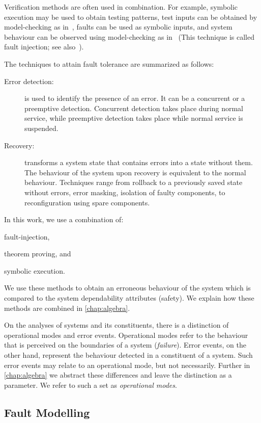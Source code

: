 \documentclass[12pt,openright,twoside,a4paper,oldfontcommands,english,brazil,final]{abntex2}
\theoremstyle{theo}
\begin{document}
Verification methods are often used in combination.
For example, symbolic execution may be used to obtain testing patterns, test inputs can be obtained by model-checking as in~\cite{CBC+2015}, faults can be used as symbolic inputs, and system behaviour can be observed using model-checking as in~\cite{DM2012,Didier2012} (This technique is called fault injection; see also~\cite{AAL+1996}).

The techniques to attain fault tolerance are summarized as follows:
\begin{description}
  \item[Error detection:] is used to identify the presence of an error.
  It can be a concurrent or a preemptive detection.
  Concurrent detection takes place during normal service, while preemptive detection takes place while normal service is suspended.
  \item[Recovery:] transforms a system state that contains errors into a state without them. The behaviour of the system upon recovery is equivalent to the normal behaviour.
  Techniques range from rollback to a previously saved state without errors, error masking, isolation of faulty components, to reconfiguration using spare components.
\end{description}

In this work, we use a combination of:
\begin{alineasinline}
  \item fault-injection,
  \item theorem proving, and
  \item symbolic execution.
\end{alineasinline}
We use these methods to obtain an erroneous behaviour of the system which is compared to the system dependability attributes (safety).
We explain how these methods are combined in \cref{chap:algebra}.

On the analyses of systems and its constituents, there is a distinction of operational modes and error events.
Operational modes refer to the behaviour that is perceived on the boundaries of a system (\emph{failure}).
Error events, on the other hand, represent the behaviour detected in a constituent of a system.
Such error events may relate to an operational mode, but not necessarily.
Further in \cref{chap:algebra} we abstract these differences and leave the distinction as a parameter.
We refer to such a set as \emph{operational modes}.

\subsection{Fault Modelling}
\end{document}
